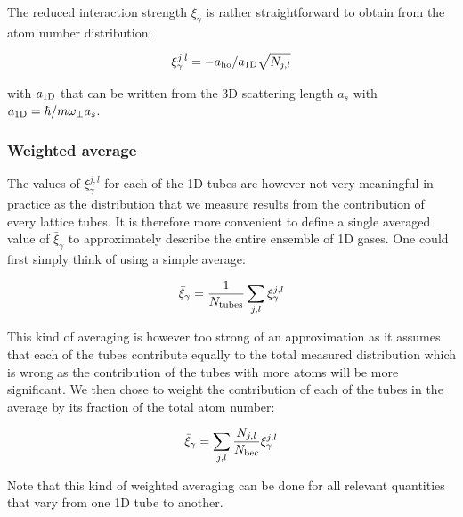 

The reduced interaction strength $\xi_{\gamma}$ is rather straightforward to obtain from the atom number distribution:

\begin{equation}
    \xi_{\gamma}^{j,l}=-a_{\rm{ho}}/a_{\rm{1D}}\sqrt{N_{j,l}}
\end{equation}

\noindent with $a_{\rm{1D}}$ that can be written from the 3D scattering length $a_s$ with $a_{\rm{1D}}=\hbar/m \omega_{\perp} a_s$.

\subsubsection{Weighted average}

\noindent The values of $\xi_{\gamma}^{j,l}$ for each of the 1D tubes are however not very meaningful in practice as the distribution that we measure results from the contribution of every lattice tubes. It is therefore more convenient to define a single averaged value of $\bar{\xi}_{\gamma}$ to approximately describe the entire ensemble of 1D gases. One could first simply think of using a simple average:

\begin{equation}
    \bar{\xi}_{\gamma} = \frac{1}{N_{\rm{tubes}}} \sum_{j,l} \xi_{\gamma}^{j,l}
\end{equation}

\noindent This kind of averaging is however too strong of an approximation as it assumes that each of the tubes contribute equally to the total measured distribution which is wrong as the contribution of the tubes with more atoms will be more significant. We then chose to weight the contribution of each of the tubes in the average by its fraction of the total atom number:

\begin{equation}
    \bar{\xi}_{\gamma} = \sum_{j,l} \frac{N_{j,l}}{N_{\rm{bec}}} \xi_{\gamma}^{j,l}
\end{equation}

\noindent Note that this kind of weighted averaging can be done for all relevant quantities that vary from one 1D tube to another.

